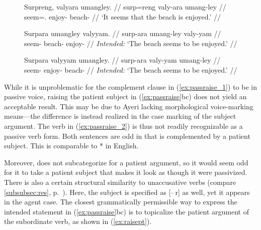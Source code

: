 \begin{figure}
\pex\label{ex:passraise}
\a\label{ex:passraise_1}\begingl
	\gla Surpreng, valyara umangley. //
	\glb surp=reng valy-ara umang-ley //
	\glc seem=\TsgI{}.\Aarg{} enjoy-\TsgI{} beach-\PargI{} //
	\glft `It seems that the beach is enjoyed.' //
\endgl

\a\label{ex:passraise_2}\ljudge*\begingl
	\gla Surpara umangley valyyam. //
	\glb surp-ara umang-ley valy-yam //
	\glc seem-\TsgI{} beach-\PargI{} enjoy-\Ptcp{} //
	\glft \textit{Intended:} `The beach seems to be enjoyed.' //
\endgl

\a\label{ex:passraise_3}\ljudge*\begingl
	\gla Surpara valyyam umangley. //
	\glb surp-ara valy-yam umang-ley //
	\glc seem-\TsgI{} enjoy-\Ptcp{} beach-\PargI{} //
	\glft \textit{Intended:} `The beach seems to be enjoyed.' //
\endgl
\xe
\end{figure}

While it is unproblematic for the complement clause in (\ref{ex:passraise_1})
to be in passive voice, raising the patient subject in (\ref{ex:passraise}bc)
does not yield an acceptable result. This may be due to Ayeri lacking
morphological voice-marking means---the difference is instead realized in the
case marking of the subject argument. The verb  in
(\ref{ex:passraise_2}) is thus not readily recognizable as a passive verb form.
Both sentences are odd in that  is complemented by a
patient subject. This is comparable to *
in English.

Moreover,  does not subcategorize for a patient argument,
so it would seem odd for it to take a patient subject that makes it look as
though it were passivized. There is also a certain structural similarity to
unaccusative verbs (compare \autoref{subsubsec:res},
p.~\pageref{subsubsec:res}). Here, the subject is specified as [–\,r] as well,
yet it appears in the agent case. The closest grammatically permissible way
to express the intended statement in (\ref{ex:passraise}bc) is to topicalize
the patient argument of the subordinate verb, as shown in (\ref{ex:raisept}).

